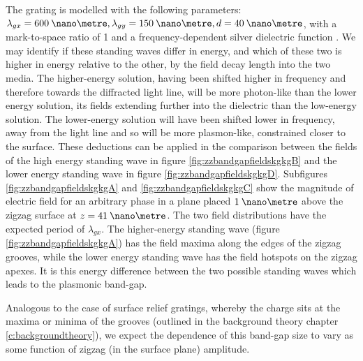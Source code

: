 The grating is modelled with the following parameters: $\lambda_{gx}=600\:\nano\metre, \lambda_{gy}=150\:\nano\metre, d=40\:\nano\metre$, with a mark-to-space ratio of 1 and a frequency-dependent silver dielectric function \cite{Nash1996}. We may identify if these standing waves differ in energy, and which of these two is higher in energy relative to the other, by the field decay length into the two media. The higher-energy solution, having been shifted higher in frequency and therefore towards the diffracted light line, will be more photon-like than the lower energy solution, its fields extending further into the dielectric than the low-energy solution. The lower-energy solution will have been shifted lower in frequency, away from the light line and so will be more plasmon-like, constrained closer to the surface. These deductions can be applied in the comparison between the fields of the high energy standing wave in figure \ref{fig:zzbandgapfieldskgkgB} and the lower energy standing wave in figure \ref{fig:zzbandgapfieldskgkgD}. Subfigures \ref{fig:zzbandgapfieldskgkgA} and \ref{fig:zzbandgapfieldskgkgC} show the magnitude of electric field for an arbitrary phase in a plane placed $1\:\nano\metre$ above the zigzag surface at $z=41 \:\nano\metre$. The two field distributions have the expected period of $\lambda_{gx}$. The higher-energy standing wave (figure \ref{fig:zzbandgapfieldskgkgA}) has the field maxima along the edges of the zigzag grooves, while the lower energy standing wave has the field hotspots on the zigzag apexes. It is this energy difference between the two possible standing waves which leads to the plasmonic band-gap.   

Analogous to the case of surface relief gratings, whereby the charge sits at the maxima or minima of the grooves (outlined in the background theory chapter \ref{c:backgroundtheory}), we expect the dependence of this band-gap size to vary as some function of zigzag (in the surface plane) amplitude. 

